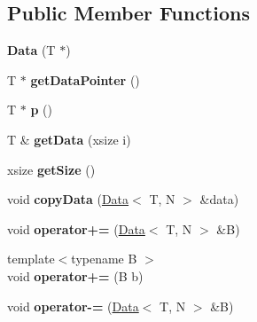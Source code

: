 \subsection*{Public Member Functions}
\begin{DoxyCompactItemize}
\item 
\hypertarget{class_x_1_1_data_a1c0ad8ff192c0c3d8d7f46bf5b988180}{{\bfseries Data} (T $\ast$)}\label{class_x_1_1_data_a1c0ad8ff192c0c3d8d7f46bf5b988180}

\item 
\hypertarget{class_x_1_1_data_a085e20937e473698958910dfe31780aa}{T $\ast$ {\bfseries get\-Data\-Pointer} ()}\label{class_x_1_1_data_a085e20937e473698958910dfe31780aa}

\item 
\hypertarget{class_x_1_1_data_ac3fd035b3814e662ef527a00034f947d}{T $\ast$ {\bfseries p} ()}\label{class_x_1_1_data_ac3fd035b3814e662ef527a00034f947d}

\item 
\hypertarget{class_x_1_1_data_a9a0a3e674daebe2750d8d7f233e7d0ce}{T \& {\bfseries get\-Data} (xsize i)}\label{class_x_1_1_data_a9a0a3e674daebe2750d8d7f233e7d0ce}

\item 
\hypertarget{class_x_1_1_data_a61f4210d3c61a8f08d7f85d52e2bf532}{xsize {\bfseries get\-Size} ()}\label{class_x_1_1_data_a61f4210d3c61a8f08d7f85d52e2bf532}

\item 
\hypertarget{class_x_1_1_data_ac9e98c6fbdfdd23b664e6ac610fd672a}{void {\bfseries copy\-Data} (\hyperlink{class_x_1_1_data}{Data}$<$ T, N $>$ \&data)}\label{class_x_1_1_data_ac9e98c6fbdfdd23b664e6ac610fd672a}

\item 
\hypertarget{class_x_1_1_data_a8c1665070bafded63fcd3bc3f7afbff2}{void {\bfseries operator+=} (\hyperlink{class_x_1_1_data}{Data}$<$ T, N $>$ \&B)}\label{class_x_1_1_data_a8c1665070bafded63fcd3bc3f7afbff2}

\item 
\hypertarget{class_x_1_1_data_a53b2f3843000d2f71386a02644e40784}{{\footnotesize template$<$typename B $>$ }\\void {\bfseries operator+=} (B b)}\label{class_x_1_1_data_a53b2f3843000d2f71386a02644e40784}

\item 
\hypertarget{class_x_1_1_data_a9dd49ecafa28bec173a1d5af0fee2a3e}{void {\bfseries operator-\/=} (\hyperlink{class_x_1_1_data}{Data}$<$ T, N $>$ \&B)}\label{class_x_1_1_data_a9dd49ecafa28bec173a1d5af0fee2a3e}


\end{DoxyCompactItemize}
